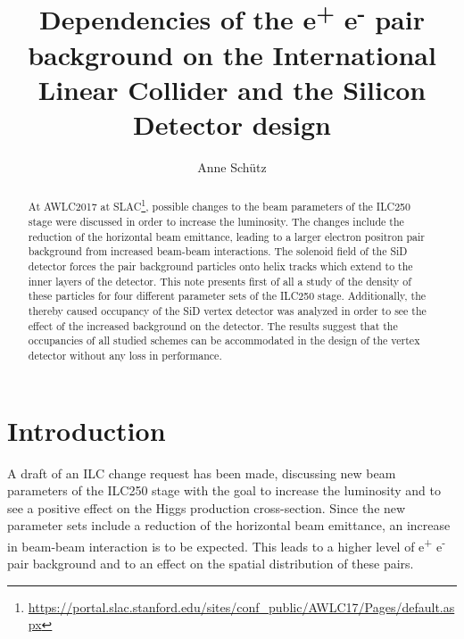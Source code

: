 \documentclass[12pt]{article}
\newcommand{\electron}{e\textsuperscript{-}\xspace}
\newcommand{\positron}{e\textsuperscript{+}\xspace}
\begin{document}

\title{Dependencies of the \positron\electron pair background on the International Linear Collider and the Silicon Detector design}

\author[1,2]{Anne Sch\"utz}


\maketitle


\begin{abstract}
At AWLC2017 at SLAC\footnote{\url{https://portal.slac.stanford.edu/sites/conf_public/AWLC17/Pages/default.aspx}}, possible changes to the beam parameters of the ILC250 stage were discussed in order to increase the luminosity.
The changes include the reduction of the horizontal beam emittance, leading to a larger electron positron pair background from increased beam-beam interactions.
The solenoid field of the SiD detector forces the pair background particles onto helix tracks which extend to the inner layers of the detector.
This note presents first of all a study of the density of these particles for four different parameter sets of the ILC250 stage.
Additionally, the thereby caused occupancy of the SiD vertex detector was analyzed in order to see the effect of the increased background on the detector.  
The results suggest that the occupancies of all studied schemes can be accommodated in the design of the vertex detector without any loss in performance.
\end{abstract}


\section{Introduction}
\label{sec:introduction}
A draft of an ILC change request has been made, discussing new beam parameters of the ILC250 stage with the goal to increase the luminosity and to see a positive effect on the Higgs production cross-section.
Since the new parameter sets include a reduction of the horizontal beam emittance, an increase in beam-beam interaction is to be expected.
This leads to a higher level of \positron\electron pair background and to an effect on the spatial distribution of these pairs.
\end{document}
